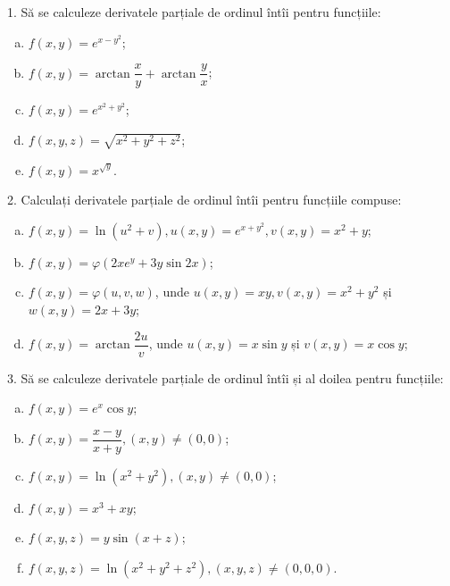 1. Să se calculeze derivatele parțiale de ordinul întîi pentru funcțiile:
\begin{enumerate}[(a)]
\item $ f(x, y) = e^{x - y^2} $;
\item $ f(x, y) = \arctan \dfrac{x}{y} + \arctan \dfrac{y}{x} $;
\item $ f(x, y) = e^{x^2 + y^2} $;
\item $ f(x, y, z) = \sqrt{x^2  + y^2 + z^2} $;
\item $ f(x, y) = x^{\sqrt{y}} $.
\end{enumerate}

\vspace{0.5cm}

2. Calculați derivatele parțiale de ordinul întîi pentru funcțiile compuse:
\begin{enumerate}[(a)]
\item $ f(x, y) = \ln(u^2 + v), u(x, y) = e^{x + y^2}, v(x, y) = x^2 + y $;
\item $ f(x, y) = \varphi(2xe^y + 3y \sin 2x) $;
\item $ f(x, y) = \varphi(u, v, w) $, unde $ u(x, y) = xy, v(x, y) = x^2 + y^2 $ și
  $ w(x, y) = 2x + 3y $;
\item $ f(x, y) = \arctan \dfrac{2u}{v} $, unde $ u(x, y) = x\sin y $ și
  $ v(x, y) = x \cos y $;
\end{enumerate}

\vspace{0.5cm}

3. Să se calculeze derivatele parțiale de ordinul întîi și al doilea
pentru funcțiile:
\begin{enumerate}[(a)]
\item $ f(x, y) = e^x \cos y $;
\item $ f(x, y) = \dfrac{x - y}{x + y}, (x, y) \neq (0, 0) $;
\item $ f(x, y) = \ln(x^2 + y^2), (x, y) \neq (0, 0) $;
\item $ f(x, y) = x^3 + xy $;
\item $ f(x, y, z) = y \sin (x + z) $;
\item $ f(x, y, z) = \ln(x^2 + y^2 + z^2), (x, y, z) \neq (0, 0, 0) $.
\end{enumerate}

\vspace{0.5cm}


